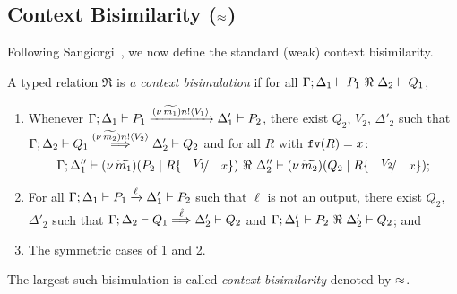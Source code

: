 \documentclass[a4paper,UKenglish]{lipics}
\theoremstyle{definition}
\begin{document}
\subsection{Context Bisimilarity ($\approx$)}
\label{subsec:bisimulation}
\noi 
Following Sangiorgi~\cite{San96H}, 
we now define 
the standard (weak) context bisimilarity. 
%
\begin{definition}\rm
\label{def:wbc}
A typed relation $\Re$ is {\em a context bisimulation} if
for all $\horel{\Gamma}{\Delta_1}{P_1}{\ \Re \ }{\Delta_2}{Q_1}$, 
	\begin{enumerate}[1)] 
	\item Whenever 
$\Gamma; \Delta_1 \vdash P_1 \xrightarrow{(\nu\, \widetilde{m_1}) n ! \langle V_1 \rangle} \Delta_1' \vdash P_2$,
there exist 
$Q_2$, $V_2$, $\Delta'_2$
such that 
$\Gamma; \Delta_2 \vdash Q_1 \stackrel{(\nu\, \widetilde{m_2}) n ! \langle V_2 \rangle}{\Longrightarrow} \Delta_2' \vdash Q_2$ and 
for all $R$ with $\mathtt{fv}(R)=x$:
\[\horel{\Gamma}{\Delta_1''}{\newsp{\widetilde{m_1}}{P_2 \Par R\subst{V_1}{x}}}
				{\ \Re\ }
				{\Delta_2''}{\newsp{\widetilde{m_2}}{Q_2 \Par R\subst{V_2}{x}}};\]  
		\item	
For all $\Gamma; \Delta_1 \vdash P_1 \xrightarrow{\ell} \Delta_1' \vdash P_2$ such that 
$\ell$ is not an output, 
 there exist $Q_2$, $\Delta'_2$ such that 
$\Gamma; \Delta_2 \vdash Q_1 \stackrel{\hat{\ell}}{\Longrightarrow} \Delta_2' \vdash Q_2$
			and
			$\horel{\Gamma}{\Delta_1'}{P_2}{\ \Re \ }{\Delta_2'}{Q_2}$; and  

                      \item	The symmetric cases of 1 and 2.                
	\end{enumerate}
	The largest such bisimulation is called \emph{context bisimilarity}  denoted by $\approx$.
\end{definition}
\end{document}
